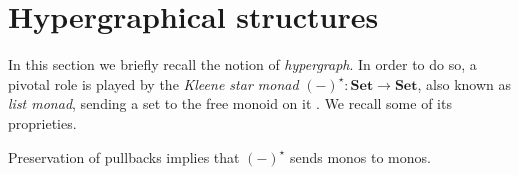 \documentclass[3p]{elsarticle}
\newcommand{\Set}{\mathbf{Set}}
\newcommand{\mto}{\rightarrowtail}
\theoremstyle{remark}
\theoremstyle{definition}
\begin{document}
\section{Hypergraphical structures}\label{sec:hyper}

In this section we briefly recall the notion of \emph{hypergraph}. In order to do so, a pivotal role is played by the \emph{Kleene star monad} $(-)^\star\colon \Set\to \Set$, also known as 
\emph{list monad},
sending a set to the free monoid on it \cite{sakarovitch2009elements,Wadler95}.
We recall some of its proprieties.


\begin{rem}\label{rem:mono}
	Preservation of pullbacks implies that $(-)^\star$ sends monos to monos.
\end{rem}
\end{document}

